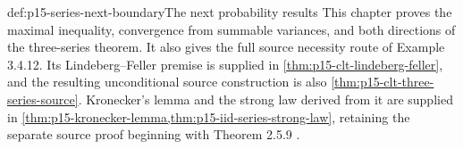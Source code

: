 \begin{proofboundary}{def:p15-series-next-boundary}{The next probability results}
This chapter proves the maximal inequality, convergence from summable
variances, and both directions of the three-series theorem. It also
gives the full source necessity route of Example 3.4.12. Its
Lindeberg--Feller premise is supplied in
\cref{thm:p15-clt-lindeberg-feller}, and the resulting unconditional
source construction is also \cref{thm:p15-clt-three-series-source}.
Kronecker's lemma and the strong law derived
from it are supplied in
\cref{thm:p15-kronecker-lemma,thm:p15-iid-series-strong-law},
retaining the separate source proof beginning with Theorem 2.5.9
\cite[pp.~85--87]{DurrettPTEAuthor2019}.
\end{proofboundary}
